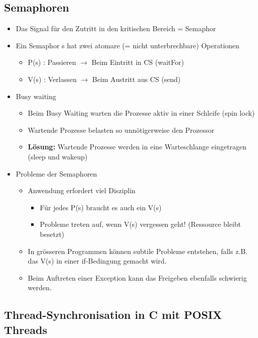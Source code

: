  \subsection{Semaphoren}
 \begin{itemize}
   \item Das Signal für den Zutritt in den kritischen Bereich = Semaphor
   \item Ein Semaphor s hat zwei atomare (= nicht unterbrechbare)
     Operationen
   \begin{itemize}
     \item P(s) : Passieren $\rightarrow$ Beim Eintritt in CS (waitFor)
     \item V(s) : Verlassen $\rightarrow$ Beim Austritt aus CS (send)
   \end{itemize}
   \item Busy waiting
   \begin{itemize}
   \item Beim Busy Waiting warten die Prozesse aktiv in einer Schleife (spin lock)
   \item Wartende Prozesse belasten so unnötigerweise den Prozessor
   \item \textbf{Lösung:} Wartende Prozesse werden in eine Warteschlange eingetragen (sleep und
wakeup)
   \end{itemize}
   \item Probleme der Semaphoren
   \begin{itemize}
    \item Anwendung erfordert viel Disziplin
    \begin{itemize}
      \item Für jedes P(s) braucht es auch ein V(s)
      \item Probleme treten auf, wenn V(s) vergessen geht! (Ressource bleibt besetzt)
    \end{itemize}
    \item In grösseren Programmen können subtile Probleme entstehen, falls z.B. das V(s) in einer if-Bedingung gemacht wird.
    \item Beim Auftreten einer Exception kann das Freigeben ebenfalls schwierig werden.
   \end{itemize}
 \end{itemize}

\subsection{Thread-Synchronisation in C mit POSIX Threads}
